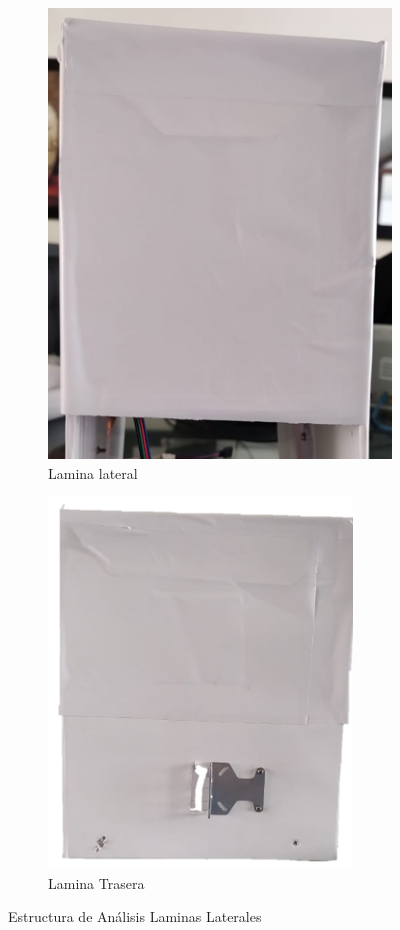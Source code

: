 \begin{figure}[h!]
	\centering
	\begin{subfigure}{0.45\linewidth}
		\centering
		\includegraphics[scale=0.3]{Figs/302.png}
		\caption{Lamina lateral}
		\label{fig:lateral}
	\end{subfigure}
	\begin{subfigure}{0.45\linewidth}
		\centering
		\includegraphics[scale=0.3]{Figs/303.png}
		\caption{Lamina Trasera}
		\label{fig:trasera}
	\end{subfigure}
	\caption{Estructura de Análisis Laminas Laterales}
	\label{fig:estructura}
\end{figure} 


